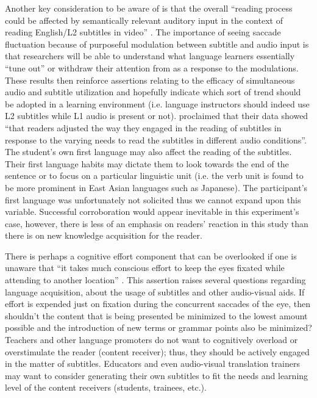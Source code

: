 Another key consideration to be aware of is that the overall ``reading
process could be affected by semantically relevant auditory input in the
context of reading English/L2 subtitles in video'' \cite[p. 260]{liao2022}. The importance of seeing saccade fluctuation because of
purposeful modulation between subtitle and audio input is that
researchers will be able to understand what language learners
essentially ``tune out'' or withdraw their attention from as a response
to the modulations. These results then reinforce assertions relating to
the efficacy of simultaneous audio and subtitle utilization and
hopefully indicate which sort of trend should be adopted in a learning
environment (i.e. language instructors should indeed use L2 subtitles
while L1 audio is present or not). \textcite[p. 260]{liao2022} proclaimed
that their data showed ``that readers adjusted the way they engaged in
the reading of subtitles in response to the varying needs to read the
subtitles in different audio conditions''. The student's own first
language may also affect the reading of the subtitles. Their first
language habits may dictate them to look towards the end of the sentence
or to focus on a particular linguistic unit (i.e. the verb unit is found
to be more prominent in East Asian languages such as Japanese). The
participant's first language was unfortunately not solicited thus we
cannot expand upon this variable. Successful corroboration would appear
inevitable in this experiment's case, however, there is less of an
emphasis on readers' reaction in this study than there is on new
knowledge acquisition for the reader.

There is perhaps a cognitive effort component that can be overlooked if
one is unaware that ``it takes much conscious effort to keep the eyes
fixated while attending to another location'' \cite[p. 85]{schotter2012}. This assertion raises several questions regarding language
acquisition, about the usage of subtitles and other audio-visual aids.
If effort is expended just on fixation during the concurrent saccades of
the eye, then shouldn't the content that is being presented be minimized
to the lowest amount possible and the introduction of new terms or
grammar points also be minimized? Teachers and other language promoters
do not want to cognitively overload or overstimulate the reader (content
receiver); thus, they should be actively engaged in the matter of
subtitles. Educators and even audio-visual translation trainers may want
to consider generating their own subtitles to fit the needs and learning
level of the content receivers (students, trainees, etc.).